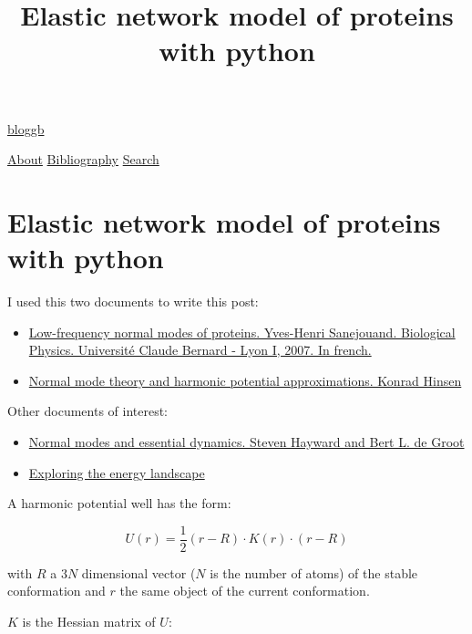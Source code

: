 \documentclass[
]{article}
\title{Elastic network model of proteins with python}
\author{}
\date{}
\providecommand{\tightlist}{%
  \setlength{\itemsep}{0pt}\setlength{\parskip}{0pt}}
\begin{document}
\maketitle

\href{/}{bloggb}

\protect\hyperlink{}{}

\href{/about/}{About} \href{/bibliography.html}{Bibliography}
\href{/search.html}{Search}

\hypertarget{elastic-network-model-of-proteins-with-python}{%
\section{Elastic network model of proteins with
python}\label{elastic-network-model-of-proteins-with-python}}

I used this two documents to write this post:

\begin{itemize}
\tightlist
\item
  \href{https://tel.archives-ouvertes.fr/file/index/docid/258781/filename/hdr2007.pdf}{Low-frequency
  normal modes of proteins. Yves-Henri Sanejouand. Biological Physics.
  Université Claude Bernard - Lyon I, 2007. In french.}
\item
  \href{http://www.pasteur.fr/recherche/unites/Binfs/EMBO2004/coursenotes/hinsen_normal_modes.pdf}{Normal
  mode theory and harmonic potential approximations. Konrad Hinsen}
\end{itemize}

Other documents of interest:

\begin{itemize}
\item
  \href{http://www3.mpibpc.mpg.de/groups/de_groot/pdf/Hayward_deGroot_nm_ed.pdf}{Normal
  modes and essential dynamics. Steven Hayward and Bert L. de Groot}
\item
  \href{http://www.engr.ucsb.edu/~shell/che210d/Exploring_the_energy_landscape.pdf}{Exploring
  the energy landscape}
\end{itemize}

A harmonic potential well has the form:

\[U(r) = \frac{1}{2}(r-R) \cdot K(r) \cdot (r-R)\]

with \(R\) a \(3N\) dimensional vector (\(N\) is the number of atoms) of
the stable conformation and \(r\) the same object of the current
conformation.

\(K\) is the Hessian matrix of \(U\):
\end{document}
